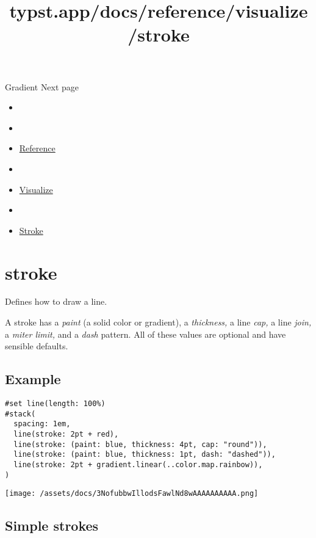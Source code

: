 { Gradient } { Next page }


\title{typst.app/docs/reference/visualize/stroke}

\begin{itemize}
\tightlist
\item
  \href{/docs}{}
\item
  
\item
  \href{/docs/reference/}{Reference}
\item
  
\item
  \href{/docs/reference/visualize/}{Visualize}
\item
  
\item
  \href{/docs/reference/visualize/stroke/}{Stroke}
\end{itemize}

\section{\texorpdfstring{{ stroke }}{ stroke }}\label{summary}

Defines how to draw a line.

A stroke has a \emph{paint} (a solid color or gradient), a
\emph{thickness,} a line \emph{cap,} a line \emph{join,} a \emph{miter
limit,} and a \emph{dash} pattern. All of these values are optional and
have sensible defaults.

\subsection{Example}\label{example}

\begin{verbatim}
#set line(length: 100%)
#stack(
  spacing: 1em,
  line(stroke: 2pt + red),
  line(stroke: (paint: blue, thickness: 4pt, cap: "round")),
  line(stroke: (paint: blue, thickness: 1pt, dash: "dashed")),
  line(stroke: 2pt + gradient.linear(..color.map.rainbow)),
)
\end{verbatim}

\texttt{[image: /assets/docs/3NofubbwIllodsFawlNd8wAAAAAAAAAA.png]}

\subsection{Simple strokes}\label{simple-strokes}

